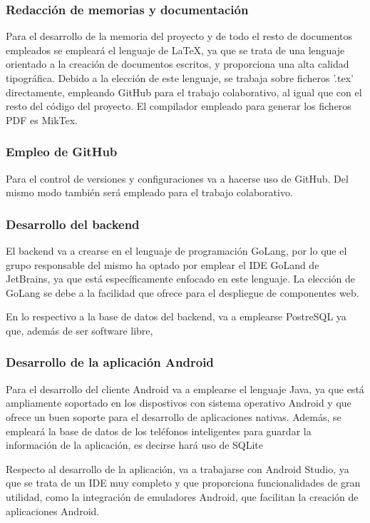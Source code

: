 \documentclass{article}
\begin{document}
\subsubsection{Redacción de memorias y documentación}
Para el desarrollo de la memoria del proyecto y de todo el resto de documentos empleados se empleará el lenguaje de \LaTeX, ya que se trata de una lenguaje orientado a la creación de documentos escritos, y proporciona una alta calidad tipográfica.
Debido a la elección de este lenguaje, se trabaja sobre ficheros '.tex' directamente, empleando GitHub para el trabajo colaborativo, al igual que con el resto del código del proyecto. El compilador empleado para generar los ficheros PDF es MikTex.

\subsubsection{Empleo de GitHub}
Para el control de versiones y configuraciones va a hacerse uso de GitHub. Del mismo modo también será empleado para el trabajo colaborativo.


\subsubsection{Desarrollo del backend}
El backend va a crearse en el lenguaje de programación GoLang, por lo que el grupo responsable del mismo ha optado por emplear el IDE GoLand de JetBrains, ya que está específicamente enfocado en este lenguaje. La elección de GoLang se debe a la facilidad que ofrece para el despliegue de componentes web.%

En lo respectivo a la base de datos del backend, va a emplearse PostreSQL ya que, además de ser software libre, %



\subsubsection{Desarrollo de la aplicación Android}
Para el desarrollo del cliente Android va a emplearse el lenguaje Java, ya que está ampliamente soportado en los dispostivos con sistema operativo Android y que ofrece un buen soporte para el desarrollo de aplicaciones nativas. Además, se empleará la base de datos de los teléfonos inteligentes para guardar la información de la aplicación, es decirse hará uso de SQLite

Respecto al desarrollo de la aplicación, va a trabajarse con Android Studio, ya que se trata de un IDE muy completo y que proporciona funcionalidades de gran utilidad, como la integración de emuladores Android, que facilitan la creación de aplicaciones Android.
\end{document}
